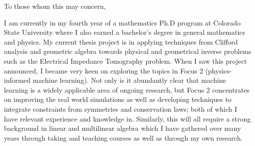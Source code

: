 \documentclass{article}
\begin{document}



\noindent To those whom this may concern,


I am currently in my fourth year of a mathematics Ph.D program at Colorado State University where I also earned a bachelor's degree in general mathematics and physics. My current thesis project is in applying techniques from Clifford analysis and geometric algebra towards physical and geometrical inverse problems such as the Electrical Impedance Tomography problem. When I saw this project announced, I became very keen on exploring the topics in Focus 2 (physics-informed machine learning). Not only is it abundantly clear that machine learning is a widely applicable area of ongoing research, but Focus 2 concentrates on improving the real world simulations as well as developing techniques to integrate constraints from symmetries and conservation laws; both of which I have relevant experience and knowledge in. Similarly, this will all require a strong background in linear and multilinear algebra which I have gathered over many years through taking and teaching courses as well as through my own research.
\end{document}

